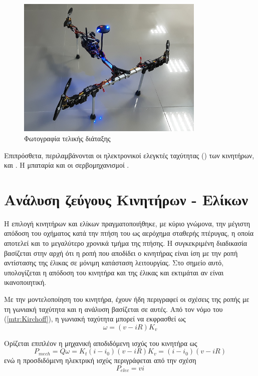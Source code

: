 \begin{figure}[H]
    \centering
    \includegraphics[width=0.8\textwidth]{Skoupa/photo.png}
    \caption{Φωτογραφία τελικής διάταξης}\label{fig:photo}
\end{figure}
 
Επιπρόσθετα, περιλαμβάνονται οι ηλεκτρονικοί ελεγκτές ταχύτητας () των 
κινητήρων,  και . Η
μπαταρία  και οι σερβομηχανισμοί 
.

\section{Ανάλυση ζεύγους Κινητήρων - Ελίκων}
\noindent Η επιλογή κινητήρων και ελίκων πραγματοποιήθηκε, με κύριο γνώμονα, 
την μέγιστη απόδοση του οχήματος  κατά την πτήση του ως αερόχημα 
σταθερής πτέρυγας, η οποία αποτελεί και το μεγαλύτερο χρονικά τμήμα της πτήσης. 
Η συγκεκριμένη διαδικασία βασίζεται στην αρχή ότι η ροπή που αποδίδει ο 
κινητήρας είναι ίση με την ροπή αντίστασης της έλικας σε μόνιμη κατάσταση 
λειτουργίας. Στο σημείο αυτό, υπολογίζεται η απόδοση του κινητήρα και της έλικας
και εκτιμάται αν είναι ικανοποιητική.

Με την μοντελοποίηση του κινητήρα, έχουν ήδη περιγραφεί οι σχέσεις της ροπής με
τη γωνιακή ταχύτητα και η ανάλυση βασίζεται σε αυτές. Από τον νόμο του 
 (\ref{mtr:Kirchoff}), η γωνιακή ταχύτητα μπορεί να εκφρασθεί ως
\begin{equation*}
    \omega = (v - iR)K_v
\end{equation*}

Ορίζεται επιπλέον η μηχανική αποδιδόμενη ισχύς του κινητήρα ως
\begin{equation}
    P_{mech} = Q \omega = K_t(i - i_0)(v - iR)K_v = (i - i_0)(v - iR)
    \label{mtr:P_m}
\end{equation}
ενώ η προσδιδόμενη ηλεκτρική ισχύς περιγράφεται από την σχέση
\begin{equation}
    P_{elec} = vi
    \label{mtr:P_e}
\end{equation}

